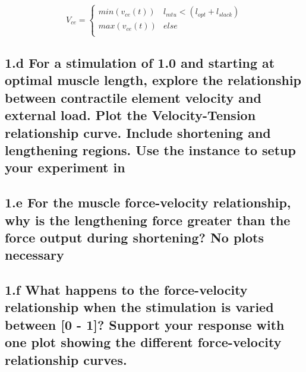 \documentclass{cmc}
\begin{document}
\begin{equation}
  \label{eq:2}
  V_{ce} = \left\{
    \begin{array}{ll}
      min(v_{ce}(t)) & l_{mtu} < (l_{opt} + l_{slack}) \\
      max(v_{ce}(t)) & else \\
    \end{array}
  \right.
\end{equation}

\subsection*{1.d For a stimulation of 1.0 and starting at optimal
  muscle length, explore the relationship between contractile element
  velocity and external load. Plot the Velocity-Tension relationship
  curve. Include shortening and lengthening regions. Use the
   instance
  to setup your experiment in }

\subsection*{1.e For the muscle force-velocity relationship, why is
  the lengthening force greater than the force output during
  shortening? No plots necessary}


\subsection*{1.f What happens to the force-velocity relationship
  when the stimulation is varied between [0 - 1]? Support your
  response with one plot showing the different force-velocity
  relationship curves.  }
\end{document}
